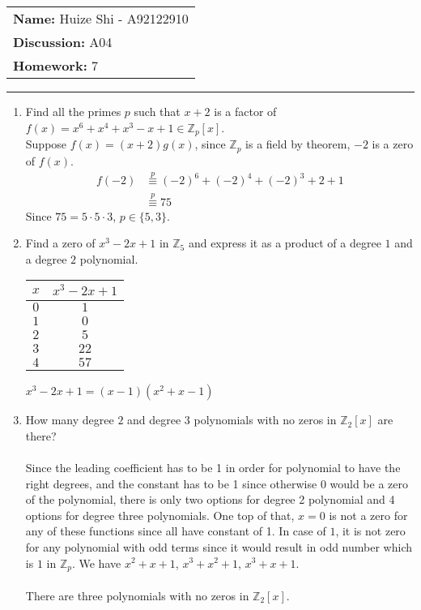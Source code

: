 \documentclass[12pt]{article}
\begin{document}
\null\hfill\begin{tabular}[t]{l@{}}
	\textbf{Name: }Huize Shi - A92122910 \\
	\textbf{Discussion: }A04 \\
	\textbf{Homework: }7
\end{tabular}
\noindent\rule{\textwidth}{0.5pt}

\begin{enumerate}

	\item Find all the primes $p$ such that $x+2$ is a factor of $f(x)=x^6 + x^4 + x^3
		-x + 1 \in \mathbb{Z}_p[x]$.\\
		Suppose $f(x) = (x+2)g(x)$, since $\mathbb{Z}_p$ is a field by theorem, $-2$
		is a zero of $f(x)$. 
		\begin{align*}
			f(-2) &\overset{p}{\equiv} (-2)^6 + (-2)^4 + (-2)^3 + 2 + 1\\
						&\overset{p}{\equiv} 75
		\end{align*}
		Since $75 = 5 \cdot 5 \cdot 3$, $p \in \{5,3\}$.

	\item Find a zero of $x^3 - 2x + 1$ in $\mathbb{Z}_5$ and express it as a
		product of a degree $1$ and a degree $2$ polynomial.
		\begin{center}
			\begin{tabular}{c|c}
				$x$ & $x^3 - 2x + 1$ \\
				\hline
				$0$ & $1$\\
				$1$ & $0$\\
				$2$ & $5$\\
				$3$ & $22$\\
				$4$ & $57$\\
			\end{tabular}
		\end{center}
		$x^3 - 2x + 1 = (x-1)(x^2 + x - 1)$
	\item How many degree $2$ and degree $3$ polynomials with no zeros in
		$\mathbb{Z}_2[x]$ are there?\\\\
		Since the leading coefficient has to be 1 in order for polynomial to have
		the right degrees, and the constant has to be 1 since otherwise $0$ would be
		a zero of the polynomial, there is only two options for degree 2 polynomial
		and 4 options for degree three polynomials. One top of that, $x=0$ is not a
		zero for any of these functions since all have constant of 1. In case of
		$1$, it is not zero for any polynomial with odd terms since it would result
		in odd number which is $1$ in $\mathbb{Z}_p$. We have $x^2+x+1$,
		$x^3+x^2+1$, $x^3+x+1$. \\\\
		There are three polynomials with no zeros in $\mathbb{Z}_2[x]$.


\end{enumerate}
\end{document}
